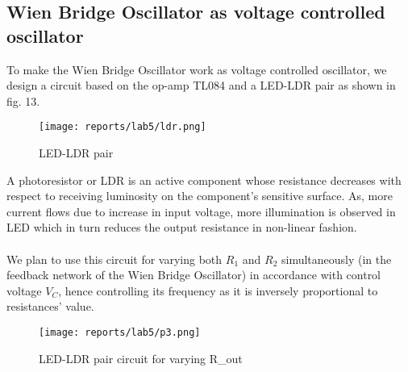 \documentclass[12pt]{article}
\begin{document}
    \subsection{Wien Bridge Oscillator as voltage controlled oscillator}
        To make the Wien Bridge Oscillator work as voltage controlled oscillator, we design a circuit based on the op-amp TL084 and a LED-LDR pair as shown in fig. 13.
        \begin{figure}[H]
            \centering
            \texttt{[image: reports/lab5/ldr.png]}
            \caption{LED-LDR pair}
        \end{figure}
        \noindent
        A photoresistor or LDR is an active component whose resistance decreases with respect to receiving luminosity on the component's sensitive surface. As, more current flows due to increase in input voltage, more illumination is observed in LED which in turn reduces the output resistance in non-linear fashion.\\\\ We plan to use this circuit for varying both $R_1$ and $R_2$ simultaneously (in the feedback network of the Wien Bridge Oscillator) in accordance with control voltage $V_C$, hence controlling its frequency as it is inversely proportional to resistances' value.\\

        \begin{figure}[H]
            \centering
            \texttt{[image: reports/lab5/p3.png]}
            \caption{LED-LDR pair circuit for varying R_{out}}
        \end{figure}
        \noindent
        
        \noindent
        
\end{document}
